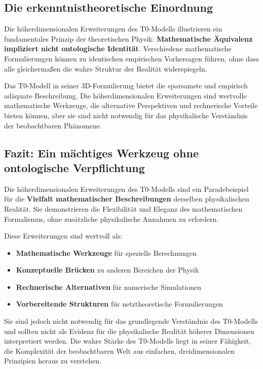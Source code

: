 \documentclass[12pt,a4paper]{report}
\begin{document}
	\subsection{Die erkenntnistheoretische Einordnung}
	
	Die höherdimensionalen Erweiterungen des T0-Modells illustrieren ein fundamentales Prinzip der theoretischen Physik: \textbf{Mathematische Äquivalenz impliziert nicht ontologische Identität}. Verschiedene mathematische Formulierungen können zu identischen empirischen Vorhersagen führen, ohne dass alle gleichermaßen die \glqq wahre\grqq{} Struktur der Realität widerspiegeln.
	
	Das T0-Modell in seiner 3D-Formulierung bietet die sparsamste und empirisch adäquate Beschreibung. Die höherdimensionalen Erweiterungen sind wertvolle mathematische Werkzeuge, die alternative Perspektiven und rechnerische Vorteile bieten können, aber sie sind nicht notwendig für das physikalische Verständnis der beobachtbaren Phänomene.
	
	\subsection{Fazit: Ein mächtiges Werkzeug ohne ontologische Verpflichtung}
	
	Die höherdimensionalen Erweiterungen des T0-Modells sind ein Paradebeispiel für die \textbf{Vielfalt mathematischer Beschreibungen} derselben physikalischen Realität. Sie demonstrieren die Flexibilität und Eleganz des mathematischen Formalismus, ohne zusätzliche physikalische Annahmen zu erfordern.
	
	Diese Erweiterungen sind wertvoll als:
	\begin{itemize}
		\item \textbf{Mathematische Werkzeuge} für spezielle Berechnungen
		\item \textbf{Konzeptuelle Brücken} zu anderen Bereichen der Physik
		\item \textbf{Rechnerische Alternativen} für numerische Simulationen
		\item \textbf{Vorbereitende Strukturen} für netztheoretische Formulierungen
	\end{itemize}
	
	Sie sind jedoch nicht notwendig für das grundlegende Verständnis des T0-Modells und sollten nicht als Evidenz für die physikalische Realität höherer Dimensionen interpretiert werden. Die wahre Stärke des T0-Modells liegt in seiner Fähigkeit, die Komplexität der beobachtbaren Welt aus einfachen, dreidimensionalen Prinzipien heraus zu verstehen.	
\end{document}
